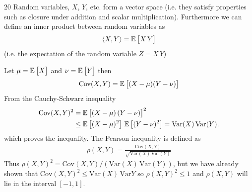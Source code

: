 \documentclass{sotonExamBoxes}    %
\begin{document}
\begin{question}{20}
  Random variables, $X$, $Y$, etc.{} form a vector space (i.e. they
  satisfy properties such as closure under addition and scalar
  multiplication).   Furthermore we can define an inner product
  between random variables as
  \begin{align*}
    \left\langle X, Y\right\rangle = \mathbb{E}_{\,}\!\left[ {\strut X\,Y} \right]
  \end{align*}
  (i.e. the expectation of the random variable $Z = X\,Y$)
  \begin{qparts}
    \begin{answer}
      Let $\mu = \mathbb{E}_{\,}\!\left[ {\strut X} \right]$ and $\nu = \mathbb{E}_{\,}\!\left[ {\strut Y} \right]$ then
      \begin{align*}
        \mathrm{Cov}(X,Y) = \mathbb{E}_{\,}\!\left[ {\strut (X-\mu)(Y-\nu)} \right]
      \end{align*}
      From the Cauchy-Schwarz inequality
      \begin{align*}
        \mathrm{Cov}(X,Y)^2
        &= \mathbb{E}_{\,}\!\left[ {\strut (X-\mu)\,(Y-\nu)} \right]^2
        \\
        &\leq \mathbb{E}_{\,}\!\left[ {\strut (X-\mu)^2} \right] \, \mathbb{E}_{\,}\!\left[ {\strut (Y-\nu)^2} \right] = \mathrm{Var}(X)\, \mathrm{Var}(Y).
      \end{align*}
      which proves the inequality.  The Pearson inequality is defined
      as
      \begin{align*}
        \rho(X,Y) =  \frac{\mathrm{Cov}(X,Y)}
        {\sqrt{\mathrm{Var}(X) \, \mathrm{Var}(Y)}}
      \end{align*}
      Thus $\rho(X,Y)^2= \mathrm{Cov}(X,Y) /\left( \mathrm{Var}(X) \,
        \mathrm{Var}(Y)\right)$, but  we have already shown that
      $\mathrm{Cov}(X,Y)^2 \leq \mathrm{Var}(X) \, \mathrm{Var}{Y}$ so
      $\rho(X,Y)^2\leq 1$ and $\rho(X,Y)$ will lie in the interval $[-1,1]$.
    \end{answer}
    \freshpage
\end{qparts}
\end{question}
\end{document}
